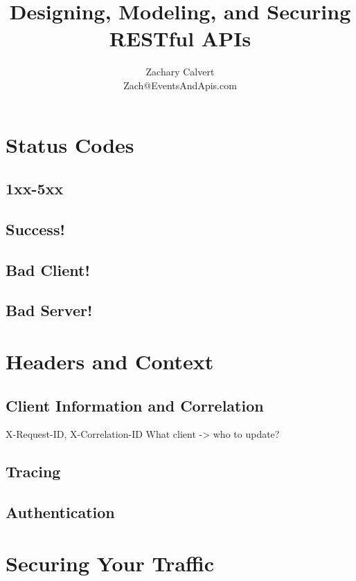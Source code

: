 \documentclass[12pt,oneside]{book} %
\title{Designing, Modeling, and Securing \\ RESTful APIs}
\author{Zachary Calvert \\Zach@EventsAndApis.com }
\begin{document}
\maketitle

\pagestyle{empty}

\frontmatter
\tableofcontents
\clearpage

\clearpage

\pagestyle{plain}



\clearpage
\mainmatter
{}




\chapter{Status Codes}
\section{1xx-5xx}
\section{Success!}
\section{Bad Client!}
\section{Bad Server!}

\chapter{Headers and Context}
\section{Client Information and Correlation}
X-Request-ID, X-Correlation-ID
What client -> who to update?
\section{Tracing}
\section{Authentication}

\chapter{Securing Your Traffic}
\end{document}
